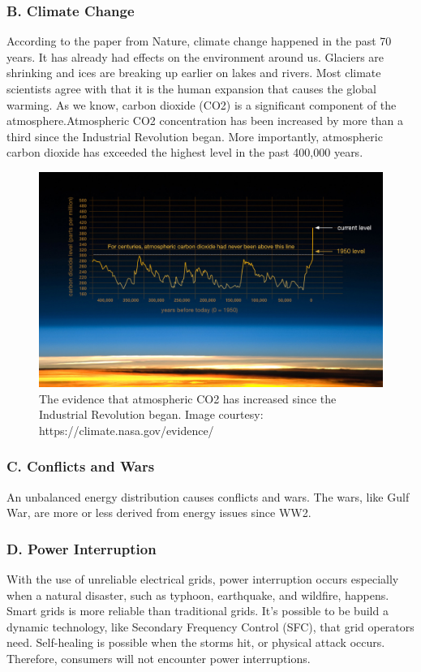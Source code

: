 \documentclass{report}
\begin{document}
\subsubsection{B. Climate Change}
According to the paper from Nature, climate change happened in the past 70 years. It has already had effects on the environment around us. Glaciers are shrinking and ices are breaking up earlier on lakes and rivers. Most climate scientists agree with that it is the human expansion that causes the global warming. As we know, carbon dioxide (CO2) is a significant component of the atmosphere.Atmospheric CO2 concentration has been increased by more than a third since the Industrial Revolution began. More importantly, atmospheric carbon dioxide has exceeded the highest level in the past 400,000 years.\\

\begin{figure}[htbp]
\centering
\includegraphics[width = \textwidth]{figure/1_1_1_nasa_co2.jpeg}
\caption{The evidence that atmospheric CO2 has increased since the Industrial Revolution began. Image courtesy: https://climate.nasa.gov/evidence/}
\label{1_1_1_nasa_co2}
\end{figure}

\subsubsection{C. Conflicts and Wars}
An unbalanced energy distribution causes conflicts and wars. The wars, like Gulf War, are more or less derived from energy issues since WW2.\\

\subsubsection{D. Power Interruption}
With the use of unreliable electrical grids, power interruption occurs especially when a natural disaster, such as typhoon, earthquake, and wildfire, happens. Smart grids is more reliable than traditional grids. It’s possible to be build a dynamic technology, like Secondary Frequency Control (SFC), that grid operators need. Self-healing is possible when the storms hit, or physical attack occurs. Therefore, consumers will not encounter power interruptions.\\
\end{document}
